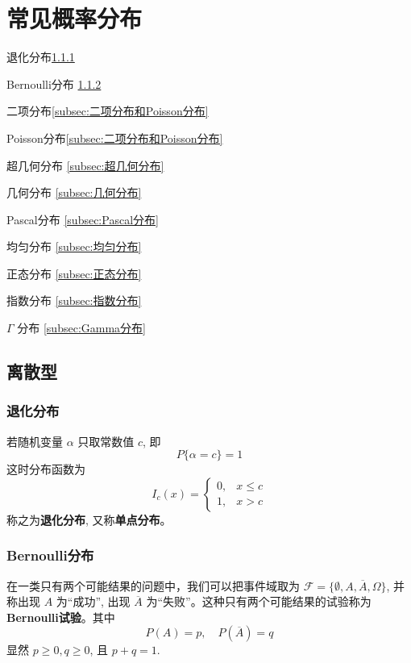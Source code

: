 \chapter{常见概率分布}\label{chap:常见概率分布}
\begin{introduction}
        \item 退化分布\quad \ref{subsec:退化分布}
        \item Bernoulli分布 \quad\ref{subsec:Bernoulli分布}
        \item 二项分布\quad \ref{subsec:二项分布和Poisson分布}
        \item Poisson分布\quad \ref{subsec:二项分布和Poisson分布} 
        \item 超几何分布 \ref{subsec:超几何分布}
        \item 几何分布 \ref{subsec:几何分布} 
        \item Pascal分布 \ref{subsec:Pascal分布}
        \item 均匀分布 \ref{subsec:均匀分布}
        \item 正态分布 \ref{subsec:正态分布}
        \item 指数分布 \ref{subsec:指数分布}
        \item $\Gamma$ 分布 \ref{subsec:Gamma分布}
\end{introduction}
\section{离散型}\label{sec:离散型}
\subsection{退化分布}\label{subsec:退化分布}
\begin{definition}[退化分布]\label{def:退化分布}
     若随机变量 $\alpha$ 只取常数值 $c$, 即
\[
P\{ \alpha = c \} = 1
\]
这时分布函数为
\begin{equation} \label{eq:degenerate_distribution_cdf}
I_c(x)=
\begin{cases}
0, & x\le c \\
1, & x>c
\end{cases}
\end{equation}
称之为\textbf{退化分布}, 又称\textbf{单点分布}。
\end{definition}
\subsection{Bernoulli分布}\label{subsec:Bernoulli分布}
\begin{definition} \label{def:bernoulli_trial}
在一类只有两个可能结果的问题中，我们可以把事件域取为 $\mathcal{F} = \{\emptyset, A, \overline{A}, \Omega \}$, 并称出现 $A$ 为“成功”, 出现 $\overline{A}$ 为“失败”。这种只有两个可能结果的试验称为\textbf{Bernoulli试验}。其中
\begin{equation} \label{eq:bernoulli_prob_pq}
P(A)=p, \quad P(\overline{A})=q
\end{equation}
显然 $p\ge 0, q\ge 0$, 且 $p+q=1$.
\end{definition}

